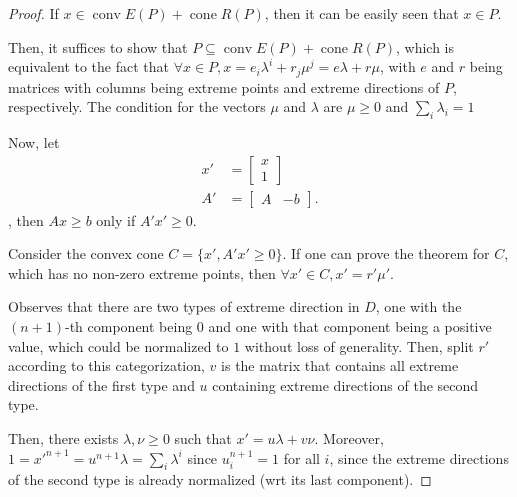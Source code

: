 \begin{proof}

If \( x \in \operatorname{conv} E(P) + \operatorname{cone} R(P) \), then it can
be easily seen that \( x \in P \).

Then, it suffices to show that \( P \subseteq \operatorname{conv} E(P)
+ \operatorname{cone} R(P) \), which is equivalent to
the fact that \( \forall x\in P, x = e_{i}\lambda^{i} + r _{j}\mu ^{j} =
e\lambda + r\mu \), with \( e \) and \( r \) being matrices with columns being
extreme points and extreme directions of \( P \), respectively. The condition
for the vectors \( \mu  \) and \( \lambda \) are \( \mu  \ge 0 \) and \(
\sum_{i} \lambda_{i} = 1 \)

Now, let
\begin{align*}
  x' &= \begin{bmatrix} x \\ 1 \end{bmatrix} \\
  A' &= \begin{bmatrix} A & -b \end{bmatrix} 
.\end{align*},
then \( Ax \ge b \) only if \( A'x' \ge  0 \).

Consider the convex cone \( C = \{x', A'x' \ge  0\}   \). If one can
prove the theorem for \( C \), which has no non-zero extreme points, then \(
\forall x' \in C, x' = r'\mu' \).

Observes that there are two types of extreme direction in \( D \), one with the
\( (n+1) \)-th component being \( 0 \) and one with that component being a
positive value, which could be normalized to \( 1 \) without loss of generality. Then, split \( r' \) according to this categorization, \( v \) is the matrix
that contains all extreme directions of the first type and \( u \) containing
extreme directions of the second type.

Then, there exists \( \lambda, \nu \ge 0 \) such that \( x' = u\lambda + v\nu \).
Moreover, \( 1 = x'^{n+1} = u^{n+1}\lambda= \sum_{i} \lambda^{i} \) since \(
u^{n+1}_{i} = 1 \) for all \( i \), since the extreme directions of the second
type is already normalized (wrt its last component).


\end{proof}
